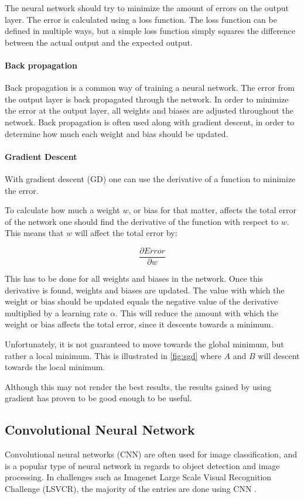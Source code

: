 The neural network should try to minimize the amount of errors on the output layer.
The error is calculated using a loss function.
The loss function can be defined in multiple ways, but a simple loss function simply squares the difference between the actual output and the expected output.

\paragraph{Back propagation}
Back propagation is a common way of training a neural network.
The error from the output layer is back propagated through the network.
In order to minimize the error at the output layer, all weights and biases are adjusted throughout the network.
Back propagation is often used along with gradient descent, in order to determine how much each weight and bias should be updated.

\paragraph{Gradient Descent}
With gradient descent (GD) one can use the derivative of a function to minimize the error.

To calculate how much a weight $w$, or bias for that matter, affects the total error of the network one should find the derivative of the function with respect to $w$.
This means that $w$ will affect the total error by:

$$\frac{\partial Error}{\partial w}$$

This has to be done for all weights and biases in the network.
Once this derivative is found, weights and biases are updated.
The value with which the weight or bias should be updated equals the negative value of the derivative multiplied by a learning rate $\alpha$.
This will reduce the amount with which the weight or bias affects the total error, since it descents towards a minimum.

Unfortunately, it is not guaranteed to move towards the global minimum, but rather a local minimum.
This is illustrated in \autoref{fig:sgd} where $A$ and $B$ will descent towards the local minimum.


Although this may not render the best results, the results gained by using gradient has proven to be good enough to be useful.

\subsection{Convolutional Neural Network}
\label{sec:cnn}
Convolutional neural networks (CNN) are often used for image classification, and is a popular type of neural network in regards to object detection and image processing.
In challenges such as Imagenet Large Scale Visual Recognition Challenge (LSVCR), the majority of the entries are done using CNN \cite{ILSVRC_Results}. 

